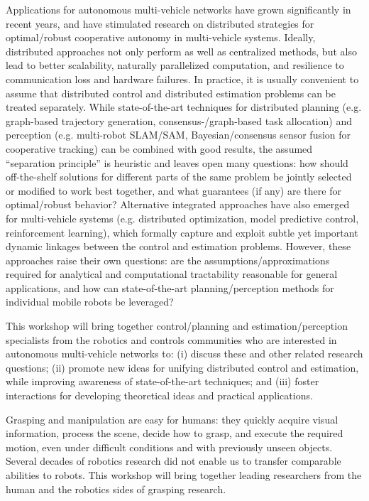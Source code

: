 \begin{spacing}{1.0}
{
Applications for autonomous multi-vehicle networks have grown significantly in recent years, and have stimulated research on distributed strategies for optimal/robust cooperative autonomy in multi-vehicle systems. Ideally, distributed approaches not only perform as well as centralized methods, but also lead to better scalability, naturally parallelized computation, and resilience to communication loss and hardware failures. In practice, it is usually convenient to assume that distributed control and distributed estimation problems can be treated separately. While state-of-the-art techniques for distributed planning (e.g. graph-based trajectory generation, consensus-/graph-based task allocation) and perception (e.g. multi-robot SLAM/SAM, Bayesian/consensus sensor fusion for cooperative tracking) can be combined with good results, the assumed “separation principle” is heuristic and leaves open many questions: how should off-the-shelf solutions for different parts of the same problem be jointly selected or modified to work best together, and what guarantees (if any) are there for optimal/robust behavior? Alternative integrated approaches have also emerged for multi-vehicle systems (e.g. distributed optimization, model predictive control, reinforcement learning), which formally capture and exploit subtle yet important dynamic linkages between the control and estimation problems. However, these approaches raise their own questions: are the assumptions/approximations required for analytical and computational tractability reasonable for general applications, and how can state-of-the-art planning/perception methods for individual mobile robots be leveraged?

This workshop will bring together control/planning and estimation/perception specialists from the robotics and controls communities who are interested in autonomous multi-vehicle networks to: (i) discuss these and other related research questions; (ii) promote new ideas for unifying distributed control and estimation, while improving awareness of state-of-the-art techniques; and (iii) foster interactions for developing theoretical ideas and practical applications.
}

{
Grasping and manipulation are easy for humans: they quickly acquire visual information, process the scene, decide how to grasp, and execute the required motion, even under difficult conditions and with previously unseen objects. Several decades of robotics research did not enable us to transfer comparable abilities to robots. This workshop will bring together leading researchers from the human and the robotics sides of grasping research.
}




\end{spacing}
